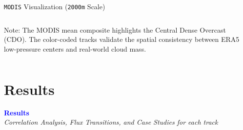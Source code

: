 \documentclass[8pt, aspectratio=169]{beamer}
\begin{document}
\begin{frame}{\texttt{MODIS} Visualization (\texttt{2000m} Scale)}
\begin{center}
        \vspace{0.2cm}
        \begin{columns}[T]
                \tiny *Note: The MODIS mean composite highlights the Central Dense Overcast (CDO). The color-coded tracks validate the spatial consistency between ERA5 low-pressure centers and real-world cloud mass.
        \end{columns}
    \end{center}

    \vspace{-0.6cm}
\end{frame}

\section{Results}
\begin{frame}
    \begin{center}
        \Huge \textcolor{blue}{\textbf{Results}} \\
        \vspace{0.5cm}
        \large \textit{Correlation Analysis, Flux Transitions, and Case Studies for each track}
    \end{center}
\end{frame}
\end{document}
